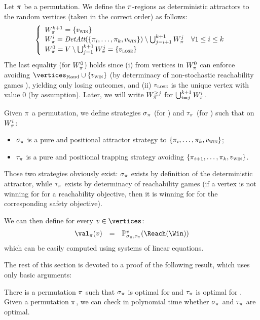 Let $\pi$ be a permutation. We define the $\pi$-regions as
deterministic attractors to the random vertices (taken in the correct
order) as follows:
\[
\left\{
\begin{array}{l}
  W_\pi^{k+1}  = \{v_{\textsc{win}}\} \\
  W_\pi^i =
  \textit{DetAtt}(\{\pi_i,\ldots,\pi_k,v_{\textsc{win}}\}) \setminus \bigcup_{j=i+1}^{k+1}
  W_\pi^j\quad \forall 1 \le i \le k \\ 
  W_\pi^0 = V \setminus \bigcup_{j=1}^{k+1} W_\pi^j = \{v_{\textsc{lose}}\}
\end{array}
\right.
\]
The last equality (for $W_\pi^0$) holds since (i) from vertices in
$W_\pi^0$ \Adam can enforce avoiding $\Randomvertices \cup
\{\vwin\}$ (by determinacy of non-stochastic reachability games
), yielding only losing outcomes, and
(ii) $v_{\textsc{lose}}$ is the unique vertex with value $0$ (by
assumption). Later, we will write $W_\pi^{\ge j}$ for
$\bigcup_{i=j}^{k+1} W_\pi^i$.

Given $\pi$ a permutation, we define strategies $\sigma_\pi$ (for
\Eve) and $\tau_\pi$ (for \Adam) such that on $W_\pi^i$:
\begin{itemize}
\item $\sigma_\pi$ is a pure and positional attractor strategy to
  $\{\pi_i,\ldots,\pi_k,v_{\textsc{win}}\}$;
\item $\tau_\pi$ is a pure and positional trapping strategy avoiding
  $\{\pi_{i+1},\ldots,\pi_k,v_{\textsc{win}}\}$.
\end{itemize}
Those two strategies obviously exist: $\sigma_\pi$ exists by
definition of the deterministic attractor, while $\tau_\pi$ exists
by determinacy of reachability games (if a vertex is not winning for
\Eve for a reachability objective, then it is winning for \Adam for
the corresponding safety objective).

We can then define for every $v \in \vertices$:
\[
\begin{array}{rcl}
\val_\perm(v) &=& \probm_{\sigma_\perm,\tau_\perm}^v(\Reach(\Win))
\end{array}
\]
which can be easily computed using systems of linear
equations. 


The rest of this section is devoted to a proof of the following
result, which uses only basic arguments:

\begin{theorem}
  \label{6-thm:corr-strat-improv}
  There is a permutation $\pi$ such that $\sigma_\pi$ is optimal
  for \Eve and $\tau_\pi$ is optimal for \Adam. Given a permutation
  $\pi$, we can check in polynomial time whether $\sigma_\pi$ and
  $\tau_\pi$ are optimal.
\end{theorem}

